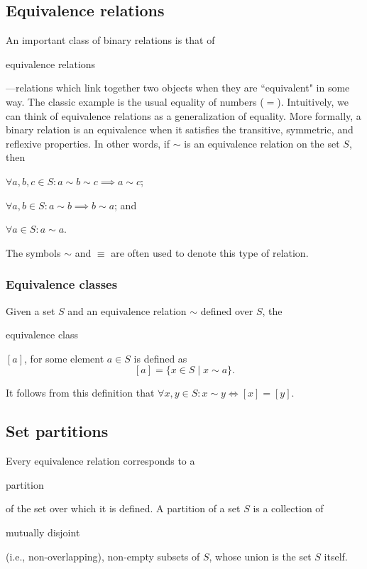 \documentclass[11pt]{article}
\theoremstyle{plain}
\theoremstyle{definition}
\newenvironment{packed_items}{
\begin{itemize}
  \setlength{\itemsep}{1pt}
  \setlength{\parskip}{0pt}
  \setlength{\parsep}{0pt}
}{\end{itemize}}
\begin{document}
\subsection*{Equivalence relations}

An important class of binary relations is that of \begin{em}equivalence relations\end{em}---relations which link together two objects when they are ``equivalent" in some way.
The classic example is the usual equality of numbers ($ = $). 
Intuitively, we can think of equivalence relations as a generalization of equality. 
More formally, a binary relation is an equivalence when it satisfies the transitive, symmetric, and reflexive properties. 
In other words, if $ \sim $ is an equivalence relation on the set $ S $, then
\begin{packed_items}
\item $ \forall a, b, c \in S : a \sim b \sim c \implies a \sim c $;
\item $ \forall a, b \in S : a \sim b \implies b \sim a $; and
\item $ \forall a \in S : a \sim a $.
\end{packed_items}

\noindent The symbols $ \sim $ and $ \equiv $ are often used to denote this type of relation. 

\subsubsection*{Equivalence classes}

Given a set $ S $ and an equivalence relation $ \sim $ defined over $ S $, the \begin{em}equivalence class\end{em} $ [a] $, for some element $ a \in S $ is defined as
$$
  [a] = \{ x \in S \mid x \sim a \}.
$$

\noindent It follows from this definition that $ \forall x, y \in S : x \sim y \iff [x] = [y] $.

\subsection*{Set partitions}

Every equivalence relation corresponds to a \begin{em}partition\end{em} of the set over which it is defined. A partition of a set $ S $ is a collection of \begin{em}mutually disjoint\end{em} (i.e., non-overlapping), non-empty subsets of $ S $, whose union is the set $ S $ itself. \\
\end{document}
